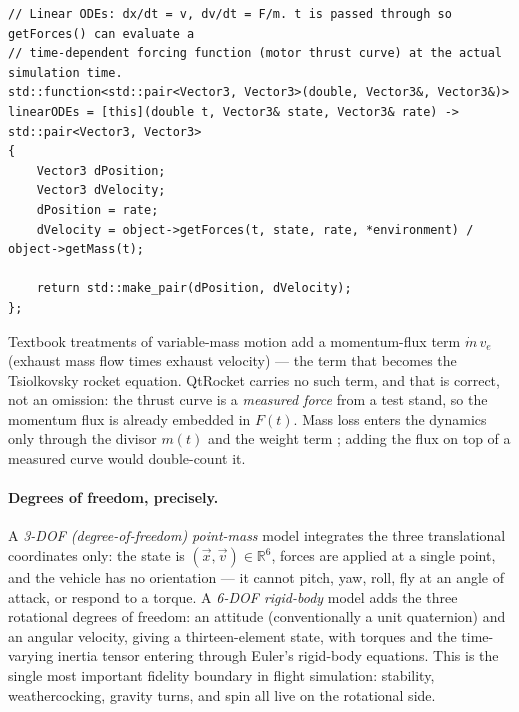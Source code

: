 \begin{listing}[htbp]
\begin{verbatim}
// Linear ODEs: dx/dt = v, dv/dt = F/m. t is passed through so getForces() can evaluate a
// time-dependent forcing function (motor thrust curve) at the actual simulation time.
std::function<std::pair<Vector3, Vector3>(double, Vector3&, Vector3&)> linearODEs = [this](double t, Vector3& state, Vector3& rate) -> std::pair<Vector3, Vector3>
{
    Vector3 dPosition;
    Vector3 dVelocity;
    dPosition = rate;
    dVelocity = object->getForces(t, state, rate, *environment) / object->getMass(t);

    return std::make_pair(dPosition, dVelocity);
};
\end{verbatim}
\caption{Newton's second law with time-varying mass, as QtRocket states it
. The time argument is threaded through so the thrust curve
and the burning mass are sampled at each solver stage's node time rather than frozen at the
step start.}\label{lst:primer-ode}
\end{listing}

\begin{keyinsight}
Textbook treatments of variable-mass motion add a momentum-flux term $\dot m\,v_e$ (exhaust
mass flow times exhaust velocity) --- the term that becomes the Tsiolkovsky rocket equation.
QtRocket carries no such term, and that is correct, not an omission: the thrust curve is a
\emph{measured force} from a test stand, so the momentum flux is already embedded in $F(t)$.
Mass loss enters the dynamics only through the divisor $m(t)$
 and the weight term ;
adding the flux on top of a measured curve would double-count it.
\end{keyinsight}

\paragraph{Degrees of freedom, precisely.} A \emph{3-DOF (degree-of-freedom) point-mass}
model integrates the three translational coordinates only: the state is
$(\vec x, \vec v) \in \mathbb{R}^6$, forces are applied at a single point, and the vehicle
has no orientation --- it cannot pitch, yaw, roll, fly at an angle of attack, or respond to
a torque. A \emph{6-DOF rigid-body} model adds the three rotational degrees of freedom: an
attitude (conventionally a unit quaternion) and an angular velocity, giving a
thirteen-element state, with torques and the time-varying inertia tensor entering through
Euler's rigid-body equations. This is the single most important fidelity boundary in flight
simulation: stability, weathercocking, gravity turns, and spin all live on the rotational
side.

